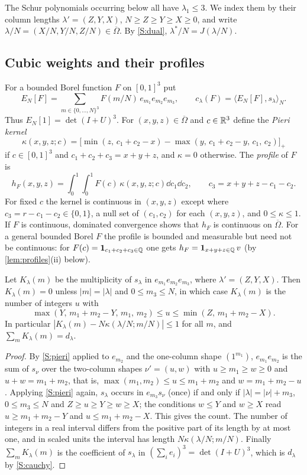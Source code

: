 \documentclass[11pt,colorlinks]{charlie}
\newcommand{\Om}{\Omega}
\newcommand{\ip}[2]{\langle #1,#2\rangle}
\begin{document}
The Schur polynomials occurring below all have $\lambda_1\le3$. We index them by their column lengths $\lambda'=(Z,Y,X)$, $N\ge Z\ge Y\ge X\ge0$, and write $\lambda/N=(X/N,Y/N,Z/N)\in\overline\Om$. By \ref{S:dual}, $\lambda^*/N=J(\lambda/N)$.

\subsection{Cubic weights and their profiles}
For a bounded Borel function $F$ on $[0,1]^3$ put
\[
 E_N[F]=\sum_{m\in\{0,\dots,N\}^3}F(m/N)\,e_{m_1}e_{m_2}e_{m_3},\qquad c_\lambda(F)=\ip{E_N[F]}{s_\lambda}_N .
\]
Thus $E_N[1]=\det(I+U)^3$. For $(x,y,z)\in\overline\Om$ and $c\in\mathbb{R}^3$ define the \emph{Pieri kernel}
\[
 \kappa(x,y,z;c)=\big[\min(z,\,c_1+c_2-x)-\max(y,\,c_1+c_2-y,\,c_1,\,c_2)\big]_+
\]
if $c\in[0,1]^3$ and $c_1+c_2+c_3=x+y+z$, and $\kappa=0$ otherwise. The \emph{profile} of $F$ is
\begin{equation}\label{eq:profile}
 h_F(x,y,z)=\int_0^1\!\!\int_0^1F(c)\,\kappa(x,y,z;c)\dd c_1\dd c_2,\qquad c_3=x+y+z-c_1-c_2 .
\end{equation}
For fixed $c$ the kernel is continuous in $(x,y,z)$ except where $c_3=r-c_1-c_2\in\{0,1\}$, a null set of $(c_1,c_2)$ for each $(x,y,z)$, and $0\le\kappa\le1$. If $F$ is continuous, dominated convergence shows that $h_F$ is continuous on $\overline\Om$. For a general bounded Borel $F$ the profile is bounded and measurable but need not be continuous: for $F(c)=\mathbf{1}_{c_1+c_2+c_3\in\mathbb{Q}}$ one gets $h_F=\mathbf{1}_{x+y+z\in\mathbb{Q}}\,v$ (by \cref{lem:profiles}(ii) below).

\begin{lemma}\label{lem:pieri}
Let $K_\lambda(m)$ be the multiplicity of $s_\lambda$ in $e_{m_1}e_{m_2}e_{m_3}$, where $\lambda'=(Z,Y,X)$. Then $K_\lambda(m)=0$ unless $|m|=|\lambda|$ and $0\le m_3\le N$, in which case $K_\lambda(m)$ is the number of integers $u$ with
\[
 \max(Y,\,m_1+m_2-Y,\,m_1,\,m_2)\le u\le\min(Z,\,m_1+m_2-X).
\]
In particular $|K_\lambda(m)-N\kappa(\lambda/N;m/N)|\le1$ for all $m$, and $\sum_mK_\lambda(m)=d_\lambda$.
\end{lemma}
\begin{proof}
By \ref{S:pieri} applied to $e_{m_2}$ and the one-column shape $(1^{m_1})$, $e_{m_1}e_{m_2}$ is the sum of $s_\nu$ over the two-column shapes $\nu'=(u,w)$ with $u\ge m_1\ge w\ge0$ and $u+w=m_1+m_2$, that is, $\max(m_1,m_2)\le u\le m_1+m_2$ and $w=m_1+m_2-u$. Applying \ref{S:pieri} again, $s_\lambda$ occurs in $e_{m_3}s_\nu$ (once) if and only if $|\lambda|=|\nu|+m_3$, $0\le m_3\le N$ and $Z\ge u\ge Y\ge w\ge X$; the conditions $w\le Y$ and $w\ge X$ read $u\ge m_1+m_2-Y$ and $u\le m_1+m_2-X$. This gives the count. The number of integers in a real interval differs from the positive part of its length by at most one, and in scaled units the interval has length $N\kappa(\lambda/N;m/N)$. Finally $\sum_mK_\lambda(m)$ is the coefficient of $s_\lambda$ in $(\sum_ie_i)^3=\det(I+U)^3$, which is $d_\lambda$ by \ref{S:cauchy}.
\end{proof}
\end{document}
